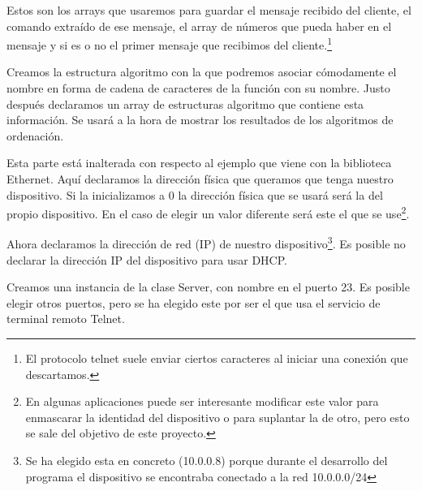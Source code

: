 
Estos son los arrays que usaremos para guardar el mensaje recibido del cliente, el comando extraído de ese mensaje, el array de números que pueda haber en el mensaje y si es o no el primer mensaje que recibimos del cliente.\protect\footnote{El protocolo telnet suele enviar ciertos caracteres al iniciar una conexión que descartamos.}


Creamos la estructura algoritmo con la que podremos asociar cómodamente el nombre en forma de cadena de caracteres de la función con su nombre. Justo después declaramos un array de estructuras algoritmo que contiene esta información. Se usará a la hora de mostrar los resultados de los algoritmos de ordenación.


Esta parte está inalterada con respecto al ejemplo que viene con la biblioteca Ethernet. Aquí declaramos la dirección física que queramos que tenga nuestro dispositivo. Si la inicializamos a 0 la dirección física que se usará será la del propio dispositivo. En el caso de elegir un valor diferente será este el que se use\protect\footnote{En algunas aplicaciones puede ser interesante modificar este valor para enmascarar la identidad del dispositivo o para suplantar la de otro, pero esto se sale del objetivo de este proyecto.}.


Ahora declaramos la dirección de red (IP) de nuestro dispositivo\protect\footnote{Se ha elegido esta en concreto (10.0.0.8) porque durante el desarrollo del programa el dispositivo se encontraba conectado a la red 10.0.0.0/24}. Es posible no declarar la dirección IP del dispositivo para usar DHCP.


Creamos una instancia de la clase Server, con nombre  en el puerto 23. Es posible elegir otros puertos, pero se ha elegido este por ser el que usa el servicio de terminal remoto Telnet.

